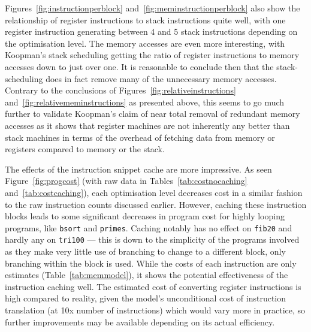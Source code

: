 Figures~\ref{fig:instructionperblock} and~\ref{fig:meminstructionperblock} also
show the relationship of register instructions to stack instructions quite well,
with one register instruction generating between 4 and 5 stack instructions
depending on the optimisation level. The memory accesses are even more
interesting, with Koopman's stack scheduling getting the ratio of register
instructions to memory accesses down to just over one. It is reasonable to
conclude then that the stack-scheduling does in fact remove many of the
unnecessary memory accesses. Contrary to the conclusions of
Figures~\ref{fig:relativeinstructions} and~\ref{fig:relativememinstructions} as
presented above, this seems to go much further to validate Koopman's claim of
near total removal of redundant memory accesses as it shows that register
machines are not inherently any better than stack machines in terms of the
overhead of fetching data from memory or registers compared to memory or the
stack.

The effects of the instruction snippet cache are more impressive. As seen
Figure~\ref{fig:progcost} (with raw data in Tables~\ref{tab:costnocaching}
and~\ref{tab:costcaching}), each optimisation level decreases cost in a similar
fashion to the raw instruction counts discussed earlier. However, caching these
instruction blocks leads to some significant decreases in program cost for
highly looping programs, like \texttt{bsort} and \texttt{primes}. Caching
notably has no effect on \texttt{fib20} and hardly any on \texttt{tri100} ---
this is down to the simplicity of the programs involved as they make very little
use of branching to change to a different block, only branching within the block
is used. While the costs of each instruction are only estimates
(Table~\ref{tab:memmodel}), it shows the potential effectiveness of the
instruction caching well. The estimated cost of converting register instructions
is high compared to reality, given the model's unconditional cost of instruction
translation (at 10x number of instructions) which would vary more in practice,
so further improvements may be available depending on its actual efficiency.

